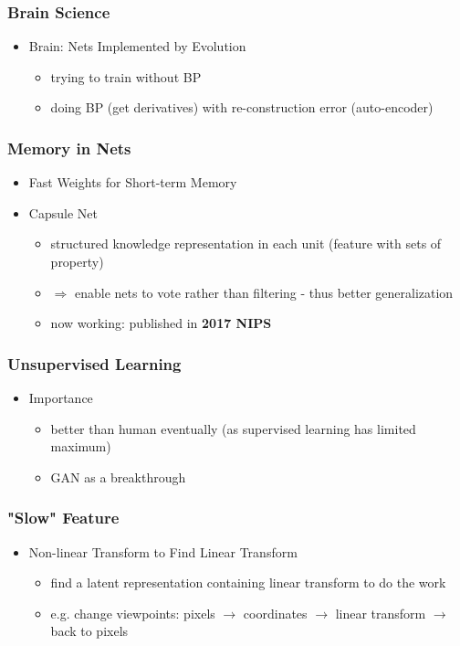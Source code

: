 \subsubsection{Brain Science}
\begin{itemize}
\item Brain: Nets Implemented by Evolution
	\begin{itemize}
	\item trying to train without BP
	\item doing BP (get derivatives) with re-construction error (auto-encoder)
	\end{itemize}
\end{itemize}

\subsubsection{Memory in Nets}
\begin{itemize}
\item Fast Weights for Short-term Memory
\item Capsule Net
	\begin{itemize}
	\item structured knowledge representation in each unit (feature with sets of property)
	\item $\Rightarrow$ enable nets to vote rather than filtering - thus better generalization
	\item now working: published in \textbf{2017 NIPS}
	\end{itemize}
\end{itemize}

\subsubsection{Unsupervised Learning}
\begin{itemize}
\item Importance
	\begin{itemize}
	\item better than human eventually (as supervised learning has limited maximum)
	\item GAN as a breakthrough
	\end{itemize}
\end{itemize}

\subsubsection{"Slow" Feature}
\begin{itemize}
\item Non-linear Transform to Find Linear Transform
	\begin{itemize}
	\item find a latent representation containing linear transform to do the work
	\item e.g. change viewpoints: pixels $\rightarrow$ coordinates $\rightarrow$ linear transform $\rightarrow$ back to pixels
	\end{itemize}
\end{itemize}

